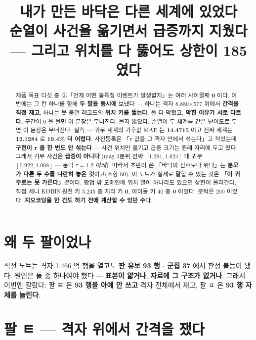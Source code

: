 \documentclass{article}
\title{내가 만든 바닥은 다른 세계에 있었다 \\
  {\large 순열이 사건을 옮기면서 급증까지 지웠다 --- 그리고 위치를 다 뚫어도 상한이 185였다}}
\begin{document}
\maketitle

\begin{abstract}
제품 목표 다섯 중 ③「언제 어떤 불특정 이벤트가 발생할지」는 여러 사이클째 \textbf{0} 이다.
이번에는 그 칸 하나를 향해 \textbf{두 팔을 동시에} 보냈다 ---
하나는 격자 8{,}880$\times$577 위에서 \textbf{간격을 직접 재고},
하나는 못 붙던 레코드의 \textbf{위치 키를 뚫는다}.
둘 다 막혔고, \textbf{막힌 이유가 서로 다르다.}
{구간이 0 을 물면 이 문장은 무너진다. 물지 않았다.}
{순열이 두 세계를 같은 난이도로 두면 이 문장은 무너진다.
실측 --- 귀무 세계의 기후값 MAE 는 \textbf{14.4715} 이고 진짜 세계는 \textbf{12.1284} 로 \textbf{19.4\% 더 어렵다}.
사전등록은 「\texttt{r} 값을 그 격자 안에서 섞는다」고 적었는데 \textbf{구현이 \texttt{r} 을 한 번도 안 섞는다} ---
사건 위치만 옮기고 급증 크기는 원래 자리에 두고 왔다. 그래서 귀무 사건은 \textbf{급증이 아니다}
(mag 3분위 진짜 $[1.291,1.624]$ 대 귀무 $[0.922,1.068]$ --- 문턱 $\tau=1.2$ \emph{아래}).}
따라서 초판이 쓴 「바닥이 신호보다 위다」는 \textbf{분모가 다른 두 수를 나란히 놓은 것}이고(조항 60),
이 노트가 실제로 말할 수 있는 것은 \textbf{「이 귀무로는 못 가른다」}뿐이다.
{팝업 밖 도메인에 위치 열이 하나라도 있으면 상한이 올라간다.
직접 세니 KOBIS 원천 키 5{,}245 중 지리 키 \textbf{0}, 아이돌 키 40 중 \textbf{0} 이었다.}
문턱은 200 이었다. \textbf{지오코딩을 한 건도 하기 전에 계산할 수 있던 수}다.
\end{abstract}

\section{왜 두 팔이었나}

직전 노트는 격자 1.466 억 행을 열고도 \textbf{판 유보 93 행 $\cdot$ 군집 37} 에서 판정 불능이 됐다.
원인은 둘 중 하나여야 했다 --- \textbf{표본이 얇거나}, \textbf{자료에 그 구조가 없거나}.
그래서 이번엔 갈랐다: 팔 ㅌ 은 \textbf{93 행을 아예 안 쓰고} 격자 전체에서 재고,
팔 ㅍ 은 \textbf{93 행 자체를 늘린다}.

\section{팔 ㅌ --- 격자 위에서 간격을 쟀다}
\end{document}
